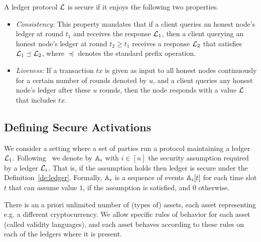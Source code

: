 \begin{definition}\label{de:ledger} A ledger protocol $\mathcal{L}$ is secure if it enjoys the following two properties.
\begin{itemize}

\item {\em Consistency:} This property mandates that if a client queries
an honest node's ledger at round $t_1$  
and receives the response $\mathcal{L}_1$, 
then a client querying an honest node's ledger at round $t_2\geq t_1 $
 receives a response $\mathcal{L}_2$ that satisfies $\mathcal{L}_1 \preceq \mathcal{L}_2$, 
where $\preceq$ denotes the standard prefix operation. 

\item {\em Liveness:} If a transaction $tx$ is given as input to all honest
nodes continuously for a certain number of rounds denoted by $u$, 
and a client queries any honest node's ledger
after these $u$ rounds, then the node responds with a value
$\mathcal{L}$ that includes $tx$.

\end{itemize}

\end{definition}

\subsection{Defining Secure Activations}
We consider a setting where a set of parties run a protocol maintaining a ledger $\mathcal{L}_1$. Following~\cite{sidechain} we denote by $\mathbb{A}_i$
with $i\in[n]$ the security assumption required by a ledger $\mathcal{L}_i$. That is, if the assumption holds then ledger is secure under the Definition~\ref{de:ledger}.
Formally, $\mathbb{A}_i$ is a sequence of events $\mathbb{A}_i[t]$ for each time slot $t$ that can assume value $1$, if the assumption is satisfied, and $0$ otherwise.

There is an a priori unlimited number of (types of) assets, each asset representing e.g. a different cryptocurrency. We allow specific rules of behavior for each asset (called validity languages), and each asset behaves according to these rules on each of the ledgers where it is present.

